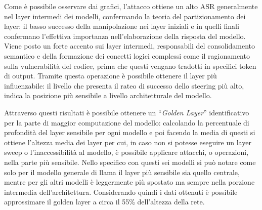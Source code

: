 Come è possibile osservare dai grafici, l'attacco ottiene un alto ASR generalmente nel layer intermedi dei modelli, confermando la teoria del partizionamento dei layer: il basso successo della manipolazione nei layer iniziali e in quelli finali confermano l'effettiva importanza nell'elaborazione della risposta del modello. Viene posto un forte accento sui layer intermedi, responsabili del consolidamento semantico e della formazione dei concetti logici complessi come il ragionamento sulla vulnerabilità del codice, prima che questi vengano tradotti in specifici token di output.
Tramite questa operazione è possibile ottenere il layer più influenzabile: il livello che presenta il rateo di successo dello steering più alto, indica la posizione più sensibile a livello architetturale del modello.

\begin{table}[H]
    \centering
    \vspace{0.2cm}
    \caption{Esito ricerca del layer più sensibile}
    \label{tab:esito_layer_sweep}
\end{table}

Attraverso questi risultati è possibile ottenere un \enquote{\textit{Golden Layer}} identificativo per la parte di maggior computazione del modello: calcolando la percentuale di profondità del layer sensibile per ogni modello e poi facendo la media di questi si ottiene l'altezza media dei layer per cui, in caso non si potesse eseguire un layer sweep o l'inaccessibilità al modello, è possibile applicare attacchi, o operazioni, nella parte più sensibile.
Nello specifico con questi sei modelli si può notare come solo per il modello generale di llama il layer più sensibile sia quello centrale, mentre per gli altri modelli è leggermente più spostato ma sempre nella porzione intermedia dell'architettura.
Considerando quindi i dati ottenuti è possibile approssimare il golden layer a circa il 55\% dell'altezza della rete.

